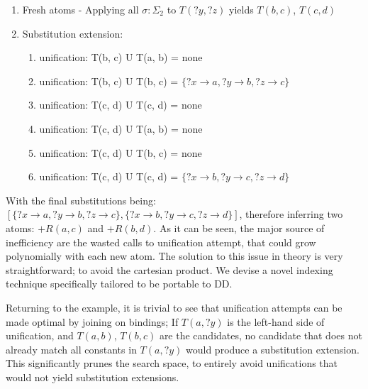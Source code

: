 \documentclass[sigconf,screen,review=false,natbib]{acmart}
\theoremstyle{definition}
\begin{document}
\begin{enumerate}
\begin{enumerate}
		      \item Fresh atoms - Applying all $\sigma : \Sigma_2$ to $T(?y, ?z)$ yields $T(b, c)$, $T(c, d)$
		      \item Substitution extension: \begin{enumerate}
			            \item unification: T(b, c) U T(a, b) = none
			            \item unification: T(b, c) U T(b, c) = $\{?x \rightarrow a, ?y \rightarrow b, ?z \rightarrow c\}$
			            \item unification: T(c, d) U T(c, d) = none
			            \item unification: T(c, d) U T(a, b) = none
			            \item unification: T(c, d) U T(b, c) = none
			            \item unification: T(c, d) U T(c, d) = $\{?x \rightarrow b, ?y \rightarrow c, ?z \rightarrow d\}$
		            \end{enumerate}
	      \end{enumerate}
\end{enumerate}
With the final substitutions being: $[\{?x \rightarrow a, ?y \rightarrow b, ?z \rightarrow c\}, \{?x \rightarrow b, ?y \rightarrow c, ?z \rightarrow d\}]$, therefore inferring two atoms:
$+R(a, c)$ and $+R(b, d)$. As it can be seen, the major source of inefficiency are the wasted calls to unification attempt, that could
grow polynomially with each new atom. The solution to this issue in theory is very straightforward; to avoid the cartesian product. We
devise a novel indexing technique specifically tailored to be portable to DD.

Returning to the example, it is trivial to see that unification attempts can be made optimal by joining on bindings; If $T(a, ?y)$ is the
left-hand side of unification, and $T(a, b)$, $T(b, c)$ are the candidates, no candidate that does not already match all constants
in $T(a, ?y)$ would produce a substitution extension. This significantly prunes the search space, to entirely avoid unifications that
would not yield substitution extensions.
\end{document}
